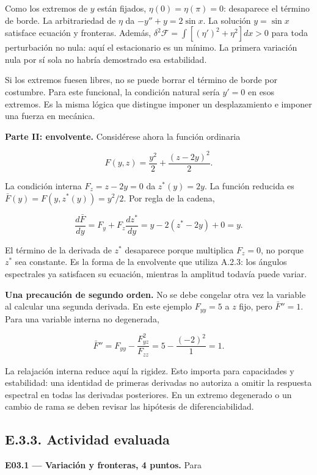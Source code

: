 \documentclass[
  spanish,
  10pt,
  a4paper,
]{article}
\begin{document}
Como los extremos de \(y\) están fijados, \(\eta(0)=\eta(\pi)=0\):
desaparece el término de borde. La arbitrariedad de \(\eta\) da
\(-y''+y=2\sin x\). La solución \(y=\sin x\) satisface ecuación y
fronteras. Además, \(\delta^2\mathcal F=\int[(\eta')^2+\eta^2]dx>0\)
para toda perturbación no nula: aquí el estacionario es un mínimo. La
primera variación nula por sí sola no habría demostrado esa estabilidad.

Si los extremos fuesen libres, no se puede borrar el término de borde
por costumbre. Para este funcional, la condición natural sería \(y'=0\)
en esos extremos. Es la misma lógica que distingue imponer un
desplazamiento e imponer una fuerza en mecánica.

\textbf{Parte II: envolvente.} Considérese ahora la función ordinaria

\[
F(y,z)=\frac{y^2}{2}+\frac{(z-2y)^2}{2}.
\tag{E.10}
\]

La condición interna \(F_z=z-2y=0\) da \(z^*(y)=2y\). La función
reducida es \(\bar F(y)=F(y,z^*(y))=y^2/2\). Por regla de la cadena,

\[
\frac{d\bar F}{dy}=F_y+F_z\frac{dz^*}{dy}
=y-2(z^*-2y)+0=y.
\tag{E.11}
\]

El término de la derivada de \(z^*\) desaparece porque multiplica
\(F_z=0\), no porque \(z^*\) sea constante. Es la forma de la envolvente
que utiliza A.2.3: los ángulos espectrales ya satisfacen su ecuación,
mientras la amplitud todavía puede variar.

\textbf{Una precaución de segundo orden.} No se debe congelar otra vez
la variable al calcular una segunda derivada. En este ejemplo
\(F_{yy}=5\) a \(z\) fijo, pero \(\bar F''=1\). Para una variable
interna no degenerada,

\[
\bar F''=F_{yy}-\frac{F_{yz}^2}{F_{zz}}=5-\frac{(-2)^2}{1}=1.
\tag{E.12}
\]

La relajación interna reduce aquí la rigidez. Esto importa para
capacidades y estabilidad: una identidad de primeras derivadas no
autoriza a omitir la respuesta espectral en todas las derivadas
posteriores. En un extremo degenerado o un cambio de rama se deben
revisar las hipótesis de diferenciabilidad.

\subsection{E.3.3. Actividad evaluada}\label{e.3.3.-actividad-evaluada}

\textbf{E03.1 --- Variación y fronteras, 4 puntos.} Para
\end{document}
